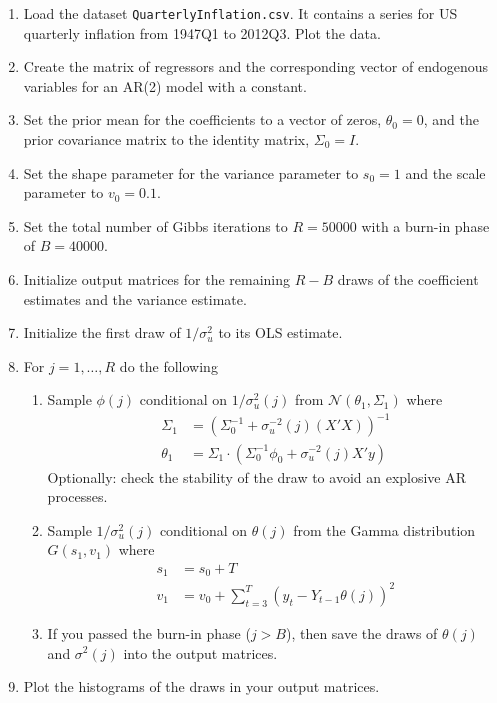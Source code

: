 \begin{enumerate}
\item Load the dataset \texttt{QuarterlyInflation.csv}.
It contains a series for US quarterly inflation from 1947Q1 to 2012Q3.
Plot the data.
\item Create the matrix of regressors and the corresponding vector of endogenous variables for an AR(2) model with a constant.
\item Set the prior mean for the coefficients to a vector of zeros, \(\theta_0 = 0\),
and the prior covariance matrix to the identity matrix, \(\Sigma_{0}=I\).
\item Set the shape parameter for the variance parameter to \(s_0=1\)
and the scale parameter to \(v_0=0.1\).
\item Set the total number of Gibbs iterations to \(R=50000\) with a burn-in phase of \(B=40000\).
\item Initialize output matrices for the remaining \(R-B\) draws of the coefficient estimates and the variance estimate.
\item Initialize the first draw of \(1/\sigma_u^2\) to its OLS estimate.
\item For \(j=1,\ldots ,R\) do the following
\begin{enumerate}	
	\item Sample \(\phi(j)\) conditional on \(1/\sigma_u^2(j)\) from \(\mathcal{N}(\theta_1,\Sigma_{1})\) where
	\begin{align*}
	\Sigma_{1} &= {(\Sigma_{0}^{-1} +\sigma_u^{-2}(j)(X'X))}^{-1}
    \\
    \theta_1 &= \Sigma_{1} \cdot (\Sigma_{0}^{-1}\phi_0 + \sigma_u^{-2}(j) X'y)
	\end{align*}
	Optionally: check the stability of the draw to avoid an explosive AR processes.
	\item Sample \(1/\sigma_u^2(j)\) conditional on \(\theta(j)\) from the Gamma distribution \(G(s_1,v_1)\)
	where
	\begin{align*}
	s_1 &= s_0 + T
	\\
	v_1 &= v_0 + \sum_{t=3}^T {(y_t-Y_{t-1}\theta(j))}^2
	\end{align*}
	\item If you passed the burn-in phase (\(j>B\)),
	then save the draws of \(\theta(j)\) and \(\sigma^2(j)\) into the output matrices.
\end{enumerate}
\item Plot the histograms of the draws in your output matrices.
\end{enumerate}


